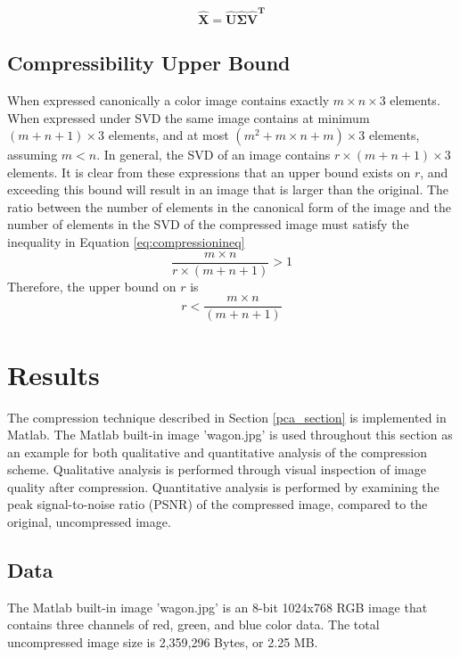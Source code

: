 \documentclass[conference]{IEEEtran}
\begin{document}
    \begin{equation}
        \mathbf{\hat{X}} = \mathbf{\hat{U}{\hat{\Sigma}}\hat{V}^T}
    \label{eq:imgrecon}
    \end{equation}

    \subsection{Compressibility Upper Bound}

    When expressed canonically a color image contains exactly $m \times n \times 3$ elements. When expressed under SVD the same image contains at minimum $(m+n+1)\times 3$ elements, and at most $(m^2 + m\times n + m) \times 3$ elements, assuming $m<n$. In general, the SVD of an image contains $r\times (m + n + 1) \times 3$ elements. It is clear from these expressions that an upper bound exists on $r$, and exceeding this bound will result in an image that is larger than the original. The ratio between the number of elements in the canonical form of the image and the number of elements in the SVD of the compressed image must satisfy the inequality in Equation \ref{eq:compressionineq}
    \begin{equation}
        \frac{m\times n}{r\times (m + n + 1)}>1
    \label{eq:compressionineq}
    \end{equation}
    Therefore, the upper bound on $r$ is
    \begin{equation}
        r < \frac{m\times n}{(m + n + 1)}
    \end{equation}
    
    \section{Results}

    The compression technique described in Section \ref{pca_section} is implemented in Matlab. The Matlab built-in image 'wagon.jpg' is used throughout this section as an example for both qualitative and quantitative analysis of the compression scheme. Qualitative analysis is performed through visual inspection of image quality after compression. Quantitative analysis is performed by examining the peak signal-to-noise ratio (PSNR) of the compressed image, compared to the original, uncompressed image.

    \subsection{Data}
    The Matlab built-in image 'wagon.jpg' is an 8-bit 1024x768 RGB image that contains three channels of red, green, and blue color data. The total uncompressed image size is 2,359,296 Bytes, or 2.25 MB.
\end{document}
